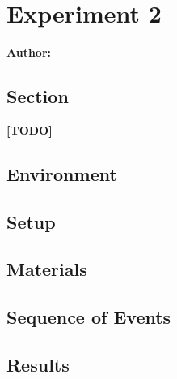 \chapter{Experiment 2}

\textbf{Author: } 

\section{Section}
\textbf{[TODO]}
\newline
\lipsum[1]

\section{Environment}

\section{Setup}

\section{Materials}

\section{Sequence of Events}

\section{Results}

\filbreak